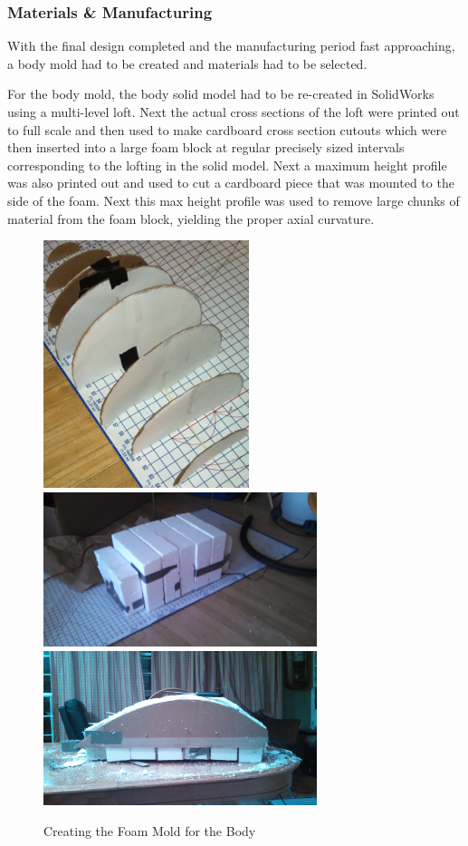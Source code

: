 \documentclass{report}
\begin{document}
\subsubsection{Materials \& Manufacturing}
With the final design completed and the manufacturing period fast approaching, a body mold had to be created and materials had to be selected.\par
For the body mold, the body solid model had to be re-created in SolidWorks using a multi-level loft.  Next the actual cross sections of the loft were printed out to full scale and then used to make cardboard cross section cutouts which were then inserted into a large foam block at regular precisely sized intervals corresponding to the lofting in the solid model.  Next a maximum height profile was also printed out and used to cut a cardboard piece that was mounted to the side of the foam. Next this max height profile was used to remove large chunks of material from the foam block, yielding the proper axial curvature. \par
\begin{figure}[H]
\centering
\includegraphics[width=6cm]{contours}
\includegraphics[width=8cm]{foam}
\includegraphics[width=8cm]{cutfoam}
\caption{Creating the Foam Mold for the Body}
\end{figure}
\end{document}

